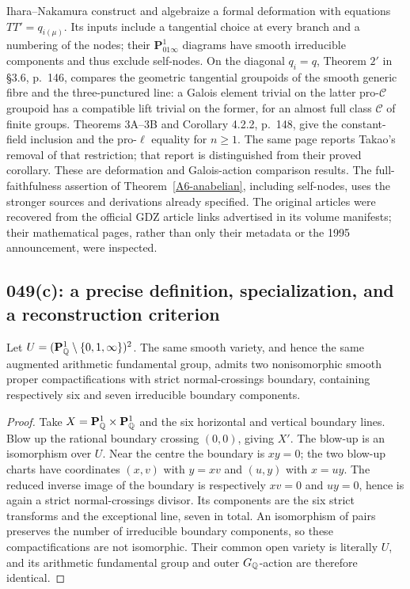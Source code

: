 Ihara--Nakamura \cite[\S2.3.6, equation $(5_\mu)$, p.~131;
Theorems 1 and $1'$, pp.~132--133]{IharaNakamura1997A567}
construct and algebraize a formal deformation with equations
$TT'=q_{i(\mu)}$. Its inputs include a tangential choice at every
branch and a numbering of the nodes; their $\mathbf P^1_{01\infty}$
diagrams have smooth irreducible components and thus exclude self-nodes.
On the diagonal $q_i=q$, Theorem $2'$ in \S3.6, p.~146, compares
the geometric tangential groupoids of the smooth generic fibre and
the three-punctured line: a Galois element trivial on the latter
pro-$\mathcal C$ groupoid has a compatible lift trivial on the former,
for an almost full class $\mathcal C$ of finite groups.
Theorems 3A--3B and Corollary 4.2.2, p.~148, give the constant-field
inclusion and the pro-$\ell$ equality for $n\ge1$.
The same page reports Takao's removal of that restriction;
that report is distinguished from their proved corollary.
These are deformation and Galois-action comparison results.
The full-faithfulness assertion of Theorem~\ref{A6-anabelian}, including
self-nodes, uses the stronger sources and derivations already specified.
The original articles were recovered from the official GDZ
article links advertised in its volume manifests; their mathematical
pages, rather than only their metadata or the 1995 announcement,
were inspected.

\subsection{049(c): a precise definition, specialization, and a reconstruction criterion}
\begin{proposition}\label{A6-blowup}
Let $U=(\mathbf P^1_{\mathbb{Q}}\setminus\{0,1,\infty\})^2$. The same smooth variety, and hence the same augmented arithmetic fundamental group, admits two nonisomorphic smooth proper compactifications with strict normal-crossings boundary, containing respectively six and seven irreducible boundary components.
\end{proposition}
\begin{proof}
Take $X=\mathbf P^1_{\mathbb{Q}}\times\mathbf P^1_{\mathbb{Q}}$ and the six horizontal and vertical boundary lines. Blow up the rational boundary crossing $(0,0)$, giving $X'$. The blow-up is an isomorphism over $U$. Near the centre the boundary is $xy=0$; the two blow-up charts have coordinates $(x,v)$ with $y=xv$ and $(u,y)$ with $x=uy$. The reduced inverse image of the boundary is respectively $xv=0$ and $uy=0$, hence is again a strict normal-crossings divisor. Its components are the six strict transforms and the exceptional line, seven in total. An isomorphism of pairs preserves the number of irreducible boundary components, so these compactifications are not isomorphic. Their common open variety is literally $U$, and its arithmetic fundamental group and outer $G_{\mathbb{Q}}$-action are therefore identical.
\end{proof}


